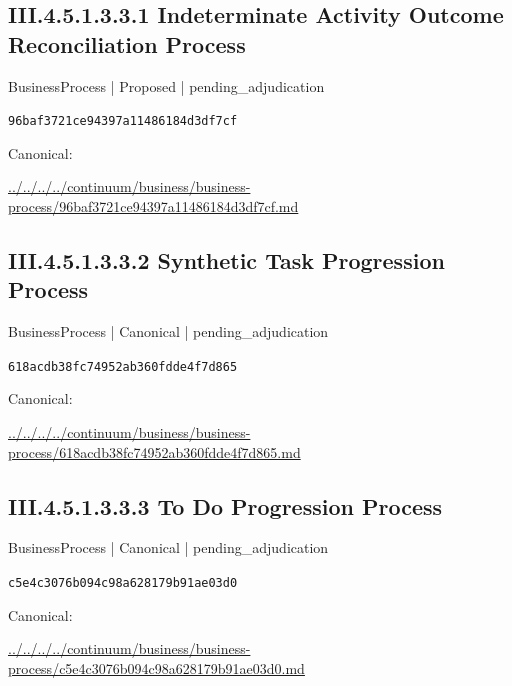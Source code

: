 \documentclass[10pt,a4paper]{article}
\begin{document}
\subsection*{III.4.5.1.3.3.1 Indeterminate Activity Outcome Reconciliation Process}
\label{element-96baf3721ce94397a11486184d3df7cf}
{\small BusinessProcess | Proposed | pending\_adjudication}\par
\texttt{96baf3721ce94397a11486184d3df7cf}\par
Canonical: \par
{\footnotesize\url{../../../../continuum/business/business-process/96baf3721ce94397a11486184d3df7cf.md}}\par
\subsection*{III.4.5.1.3.3.2 Synthetic Task Progression Process}
\label{element-618acdb38fc74952ab360fdde4f7d865}
{\small BusinessProcess | Canonical | pending\_adjudication}\par
\texttt{618acdb38fc74952ab360fdde4f7d865}\par
Canonical: \par
{\footnotesize\url{../../../../continuum/business/business-process/618acdb38fc74952ab360fdde4f7d865.md}}\par
\subsection*{III.4.5.1.3.3.3 To Do Progression Process}
\label{element-c5e4c3076b094c98a628179b91ae03d0}
{\small BusinessProcess | Canonical | pending\_adjudication}\par
\texttt{c5e4c3076b094c98a628179b91ae03d0}\par
Canonical: \par
{\footnotesize\url{../../../../continuum/business/business-process/c5e4c3076b094c98a628179b91ae03d0.md}}\par
\end{document}
